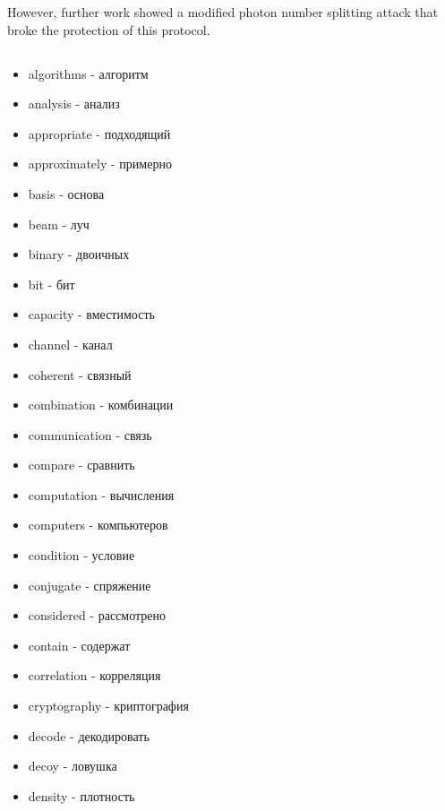 However, further work showed a modified photon number splitting attack that broke the protection of this protocol.

\subsection{\dic}
\begin{multicols}{2}
\begin{itemize}

\item algorithms - алгоритм
\item analysis - анализ

\item appropriate - подходящий
\item approximately - примерно


\item basis - основа
\item beam - луч

\item binary - двоичных
\item bit - бит

\item capacity - вместимость

\item channel - канал

\item coherent - связный
\item combination - комбинации

\item communication - связь
\item compare - сравнить

\item computation - вычисления
\item computers - компьютеров

\item condition - условие
\item conjugate - спряжение
\item considered - рассмотрено
\item contain - содержат

\item correlation - корреляция

\item cryptography - криптография

\item decode - декодировать
\item decoy - ловушка
\item density - плотность


\end{itemize}
\end{multicols}
